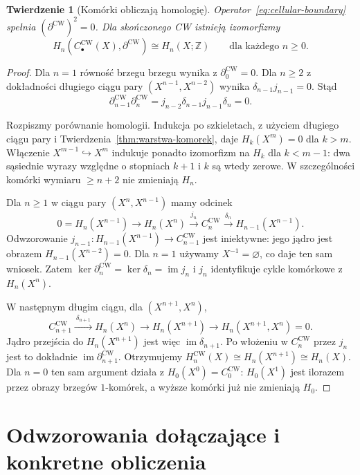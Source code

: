 \documentclass[11pt,a4paper,oneside]{report}
\newcommand{\Z}{\mathbb{Z}}
\theoremstyle{plain}
\newtheorem{twierdzenie}{Twierdzenie}[section]
\theoremstyle{definition}
\theoremstyle{remark}
\begin{document}
\begin{twierdzenie}[Komórki obliczają homologię]
\label{thm:komorkowa-singularna}
Operator~\eqref{eq:cellular-boundary}
spełnia $(\partial^{\mathrm{CW}})^2=0$.
Dla skończonego CW istnieją
izomorfizmy
\[
 H_n(C_\bullet^{\mathrm{CW}}(X),
       \partial^{\mathrm{CW}})
 \cong H_n(X;\Z)
 \qquad\text{dla każdego }n\geq0.
\]
\end{twierdzenie}
\begin{proof}
Dla $n=1$ równość brzegu brzegu wynika z $\partial_0^{\mathrm{CW}}=0$.
Dla $n\geq2$ z dokładności długiego ciągu
pary $(X^{n-1},X^{n-2})$
wynika $\delta_{n-1}j_{n-1}=0$.
Stąd
\[
 \partial^{\mathrm{CW}}_{n-1}
 \partial^{\mathrm{CW}}_n
 =j_{n-2}\delta_{n-1}j_{n-1}\delta_n=0.
\]

Rozpiszmy porównanie homologii.
Indukcja po szkieletach,
z użyciem długiego ciągu pary
i Twierdzenia~\ref{thm:warstwa-komorek},
daje $H_k(X^m)=0$ dla $k>m$.
Włączenie $X^{m-1}\hookrightarrow X^m$
indukuje ponadto izomorfizm na
$H_k$ dla $k<m-1$: dwa sąsiednie
wyrazy względne o stopniach
$k+1$ i $k$ są wtedy zerowe.
W szczególności komórki wymiaru
$\geq n+2$ nie zmieniają $H_n$.

Dla $n\geq1$ w ciągu pary
$(X^n,X^{n-1})$ mamy odcinek
\[
 0=H_n(X^{n-1})\longrightarrow
 H_n(X^n)\xrightarrow{\ j_n\ }
 C_n^{\mathrm{CW}}
 \xrightarrow{\ \delta_n\ }
 H_{n-1}(X^{n-1}).
\]
Odwzorowanie $j_{n-1}:H_{n-1}(X^{n-1})
\to C_{n-1}^{\mathrm{CW}}$
jest iniektywne: jego jądro
jest obrazem
$H_{n-1}(X^{n-2})=0$.
Dla $n=1$ używamy
$X^{-1}=\varnothing$, co daje
ten sam wniosek.
Zatem $\ker\partial_n^{\mathrm{CW}}
=\ker\delta_n=\operatorname{im}j_n$
i $j_n$ identyfikuje cykle
komórkowe z $H_n(X^n)$.

W następnym długim ciągu,
dla $(X^{n+1},X^n)$,
\[
 C_{n+1}^{\mathrm{CW}}
 \xrightarrow{\ \delta_{n+1}\ }
 H_n(X^n)\longrightarrow
 H_n(X^{n+1})\longrightarrow
 H_n(X^{n+1},X^n)=0.
\]
Jądro przejścia do $H_n(X^{n+1})$
jest więc $\operatorname{im}\delta_{n+1}$.
Po włożeniu w $C_n^{\mathrm{CW}}$
przez $j_n$ jest to dokładnie
$\operatorname{im}\partial_{n+1}^{\mathrm{CW}}$.
Otrzymujemy
$H_n^{\mathrm{CW}}(X)\cong
H_n(X^{n+1})\cong H_n(X)$.
Dla $n=0$ ten sam argument działa
z $H_0(X^0)=C_0^{\mathrm{CW}}$:
$H_0(X^1)$ jest ilorazem przez
obrazy brzegów $1$-komórek,
a wyższe komórki już nie
zmieniają $H_0$.
\end{proof}

\section{Odwzorowania dołączające i konkretne obliczenia}
\label{sec:obliczenia-homologii}
\end{document}
